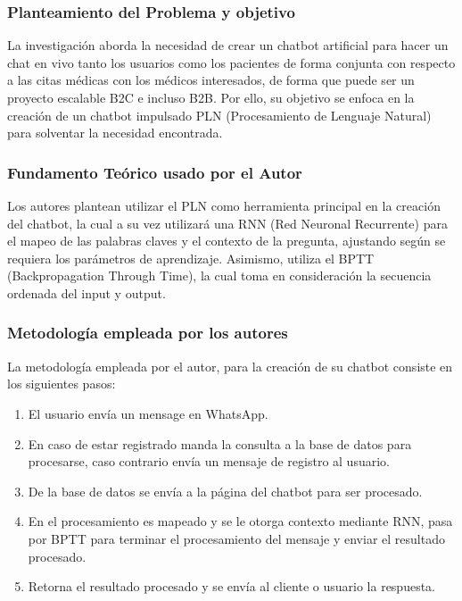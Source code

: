 \subsubsection{Planteamiento del Problema y objetivo }

La investigación aborda la necesidad de crear un chatbot artificial para hacer un chat en vivo tanto los usuarios como los pacientes de forma conjunta con respecto a las citas médicas con los médicos interesados, de forma que puede ser un proyecto escalable B2C e incluso B2B. Por ello, su objetivo se enfoca en la creación de un chatbot impulsado  PLN (Procesamiento de Lenguaje Natural) para solventar la necesidad encontrada.

\subsubsection{Fundamento Teórico usado por el Autor}

Los autores plantean utilizar el PLN como herramienta principal en la creación del chatbot, la cual a su vez utilizará una RNN (Red Neuronal Recurrente) para el mapeo de las palabras claves y el contexto de la pregunta, ajustando según se requiera los parámetros de aprendizaje. Asimismo, utiliza el BPTT (Backpropagation Through Time), la cual toma en consideración la secuencia ordenada del input y output.

\subsubsection{Metodología empleada por los autores}
La metodología empleada por el autor, para la creación de su chatbot consiste en los siguientes pasos: 

\begin{enumerate}
    \item El usuario envía un mensage en WhatsApp.
    \item En caso de estar registrado manda la consulta a la base de datos para procesarse, caso contrario envía un mensaje de registro al usuario.
    \item De la base de datos se envía a la página del chatbot para ser procesado.
    \item En el procesamiento es mapeado y se le otorga contexto  mediante RNN, pasa por BPTT para terminar el procesamiento del mensaje y enviar el resultado procesado.
    \item Retorna el resultado procesado y se envía al cliente o usuario la respuesta.
\end{enumerate}

